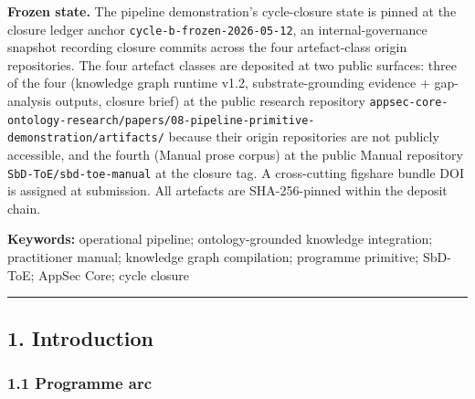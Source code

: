 \documentclass[
]{article}
\begin{document}
\textbf{Frozen state.} The pipeline demonstration's cycle-closure state
is pinned at the closure ledger anchor
\texttt{cycle-b-frozen-2026-05-12}, an internal-governance snapshot
recording closure commits across the four artefact-class origin
repositories. The four artefact classes are deposited at two public
surfaces: three of the four (knowledge graph runtime v1.2,
substrate-grounding evidence + gap-analysis outputs, closure brief) at
the public research repository
\texttt{appsec-core-ontology-research/papers/08-pipeline-primitive-demonstration/artifacts/}
because their origin repositories are not publicly accessible, and the
fourth (Manual prose corpus) at the public Manual repository
\texttt{SbD-ToE/sbd-toe-manual} at the closure tag. A cross-cutting
figshare bundle DOI is assigned at submission. All artefacts are
SHA-256-pinned within the deposit chain.

\textbf{Keywords:} operational pipeline; ontology-grounded knowledge
integration; practitioner manual; knowledge graph compilation; programme
primitive; SbD-ToE; AppSec Core; cycle closure

\begin{center}\rule{0.5\linewidth}{0.5pt}\end{center}

\subsection{1. Introduction}\label{introduction}

\subsubsection{1.1 Programme arc}\label{programme-arc}
\end{document}
